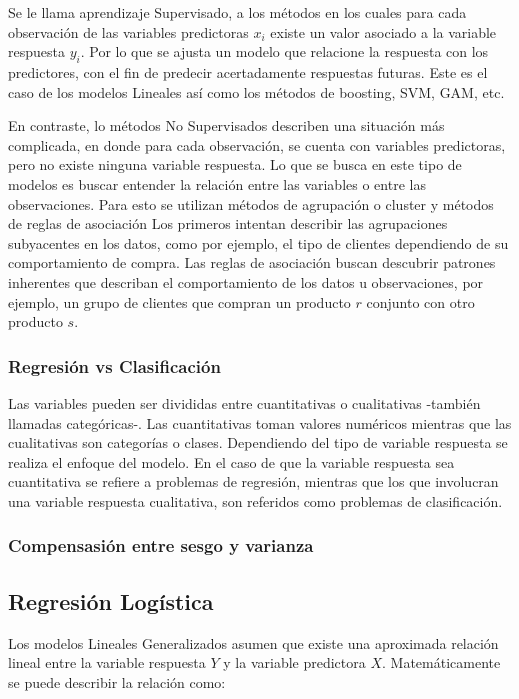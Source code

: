 \documentclass[a4paper,12pt]{Latex/Classes/PhDthesisPSnPDF}
\begin{document}
Se le llama aprendizaje Supervisado, a los métodos en los cuales para cada observación de las variables predictoras $x_{i}$ existe un valor asociado a la variable respuesta $y_{i}$. Por lo que se ajusta un modelo que relacione la respuesta con los predictores, con el fin de predecir acertadamente respuestas futuras. Este es el caso de los modelos Lineales así como los métodos de boosting, SVM, GAM, etc. 

En contraste, lo métodos No Supervisados describen una situación más complicada, en donde para cada observación, se cuenta con variables predictoras, pero no existe ninguna variable respuesta. Lo que se busca en este tipo de modelos es buscar entender la relación entre las variables o entre las observaciones. Para esto se utilizan métodos de agrupación o cluster y métodos de reglas de asociación Los primeros intentan describir las agrupaciones subyacentes en los datos, como por ejemplo, el tipo de clientes dependiendo de su comportamiento de compra. Las reglas de asociación buscan descubrir patrones inherentes que describan el comportamiento de los datos u observaciones, por ejemplo, un grupo de clientes que compran un producto $r$ conjunto con otro producto $s$.

\subsubsection{Regresión vs Clasificación}

Las variables pueden ser divididas entre cuantitativas o cualitativas -también llamadas categóricas-. Las cuantitativas toman valores numéricos mientras que las cualitativas son categorías o clases. Dependiendo del tipo de variable respuesta se realiza el enfoque del modelo. En el caso de que la variable respuesta sea cuantitativa se refiere a problemas de regresión, mientras que los que involucran una variable respuesta cualitativa, son referidos como problemas de clasificación.

\subsubsection{Compensasión entre sesgo y varianza}


\subsection{Regresión Logística}

Los modelos Lineales Generalizados asumen que existe una aproximada relación lineal entre la variable respuesta $Y$ y la variable predictora $X$. Matemáticamente se puede describir la relación como:
\end{document}
